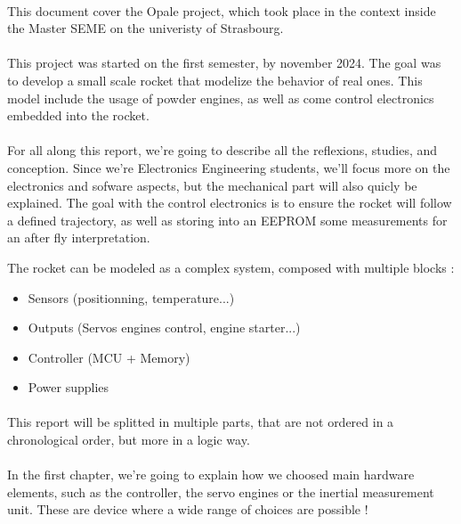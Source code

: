 \paragraph{}
This document cover the Opale project, which took place in the context inside
the Master SEME on the univeristy of Strasbourg.

\paragraph{}
This project was started on the first semester, by november 2024. The goal was
to develop a small scale rocket that modelize the behavior of real ones. This
model include the usage of powder engines, as well as come control electronics
embedded into the rocket.

\paragraph{}
For all along this report, we're going to describe all the reflexions, studies,
and conception. Since we're Electronics Engineering students, we'll focus more
on the electronics and sofware aspects, but the mechanical part will also
quicly be explained. The goal with the control electronics is to ensure the
rocket will follow a defined trajectory, as well as storing into an EEPROM some
measurements for an after fly interpretation.

The rocket can be modeled as a complex system, composed with multiple blocks :

\begin{itemize}[noitemsep]
    \item   Sensors (positionning, temperature...)
    \item   Outputs (Servos engines control, engine starter...)
    \item   Controller (MCU + Memory)
    \item   Power supplies
\end{itemize}

\paragraph{}
This report will be splitted in multiple parts, that are not ordered in a
chronological order, but more in a logic way.

\paragraph{}
In the first chapter, we're going to explain how we choosed main hardware
elements, such as the controller, the servo engines or the inertial measurement
unit. These are device where a wide range of choices are possible !

